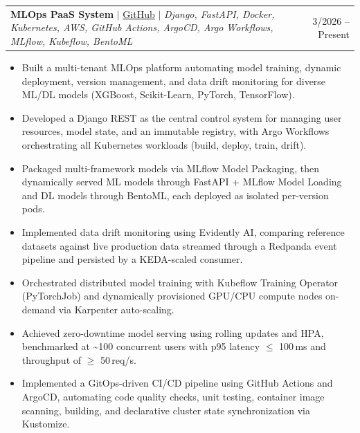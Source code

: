 \documentclass[letterpaper,11pt]{article}
\makeatletter
\newcommand{\resumeItem}[1]{
  \item\small{{#1 \vspace{-2pt}}}
}
\newcommand{\resumeProjectHeading}[2]{
    \item
    \begin{tabular*}{0.97\textwidth}{p{0.78\textwidth}@{\extracolsep{\fill}}r}
      \small#1 & #2 \\
    \end{tabular*}\vspace{-7pt}
}
\newcommand{\resumeItemListStart}{\begin{itemize}[leftmargin=0.18in]}
\newcommand{\resumeItemListEnd}{\end{itemize}\vspace{-5pt}}
\makeatother
\begin{document}
\resumeProjectHeading
{\textbf{MLOps PaaS System} $|$ \href{https://github.com/Viet-Hoang-2005/mlops-paas-system}{GitHub} $|$ \emph{Django, FastAPI, Docker, Kubernetes, AWS, GitHub Actions, ArgoCD, Argo Workflows, MLflow, Kubeflow, BentoML}}
{3/2026 -- Present}
\resumeItemListStart
\resumeItem{Built a multi-tenant MLOps platform automating model training, dynamic deployment, version management, and data drift monitoring for diverse ML/DL models (XGBoost, Scikit-Learn, PyTorch, TensorFlow).}
\resumeItem{Developed a Django REST as the central control system for managing user resources, model state, and an immutable registry, with Argo Workflows orchestrating all Kubernetes workloads (build, deploy, train, drift).}
\resumeItem{Packaged multi-framework models via MLflow Model Packaging, then dynamically served ML models through FastAPI + MLflow Model Loading and DL models through BentoML, each deployed as isolated per-version pods.}
\resumeItem{Implemented data drift monitoring using Evidently AI, comparing reference datasets against live production data streamed through a Redpanda event pipeline and persisted by a KEDA-scaled consumer.}
\resumeItem{Orchestrated distributed model training with Kubeflow Training Operator (PyTorchJob) and dynamically provisioned GPU/CPU compute nodes on-demand via Karpenter auto-scaling.}
\resumeItem{Achieved zero-downtime model serving using rolling updates and HPA, benchmarked at \textasciitilde100 concurrent users with p95 latency $\leq$ 100\,ms and throughput of $\geq$ 50\,req/s.}
\resumeItem{Implemented a GitOps-driven CI/CD pipeline using GitHub Actions and ArgoCD, automating code quality checks, unit testing, container image scanning, building, and declarative cluster state synchronization via Kustomize.}
\resumeItemListEnd
\end{document}
